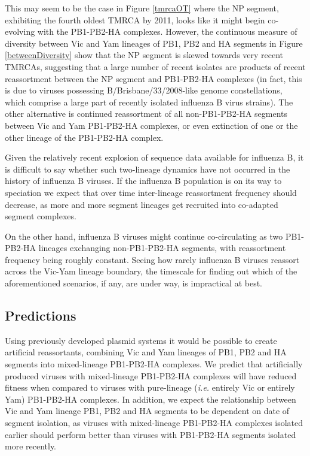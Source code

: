 \documentclass[11pt,oneside,letterpaper]{article}
\begin{document}
This may seem to be the case in Figure \ref{tmrcaOT} where the NP segment, exhibiting the fourth oldest TMRCA by 2011, looks like it might begin co-evolving with the PB1-PB2-HA complexes. 
However, the continuous measure of diversity between Vic and Yam lineages of PB1, PB2 and HA segments in Figure \ref{betweenDiversity} show that the NP segment is skewed towards very recent TMRCAs, suggesting that a large number of recent isolates are products of recent reassortment between the NP segment and PB1-PB2-HA complexes (in fact, this is due to viruses possessing B/Brisbane/33/2008-like genome constellations, which comprise a large part of recently isolated influenza B virus strains).
The other alternative is continued reassortment of all non-PB1-PB2-HA segments between Vic and Yam PB1-PB2-HA complexes, or even extinction of one or the other lineage of the PB1-PB2-HA complex.

Given the relatively recent explosion of sequence data available for influenza B, it is difficult to say whether such two-lineage dynamics have not occurred in the history of influenza B viruses.
If the influenza B population is on its way to speciation we expect that over time inter-lineage reassortment frequency should decrease, as more and more segment lineages get recruited into co-adapted segment complexes.

On the other hand, influenza B viruses might continue co-circulating as two PB1-PB2-HA lineages exchanging non-PB1-PB2-HA segments, with reassortment frequency being roughly constant.
Seeing how rarely influenza B viruses reassort across the Vic-Yam lineage boundary, the timescale for finding out which of the aforementioned scenarios, if any, are under way, is impractical at best.

\subsection*{Predictions}
Using previously developed plasmid systems \cite{hoffmann2002} it would be possible to create artificial reassortants, combining Vic and Yam lineages of PB1, PB2 and HA segments into mixed-lineage PB1-PB2-HA complexes.
We predict that artificially produced viruses with mixed-lineage PB1-PB2-HA complexes will have reduced fitness when compared to viruses with pure-lineage (\textit{i.e.} entirely Vic or entirely Yam) PB1-PB2-HA complexes.
In addition, we expect the relationship between Vic and Yam lineage PB1, PB2 and HA segments to be dependent on date of segment isolation, as viruses with mixed-lineage PB1-PB2-HA complexes isolated earlier should perform better than viruses with PB1-PB2-HA segments isolated more recently.
\end{document}
